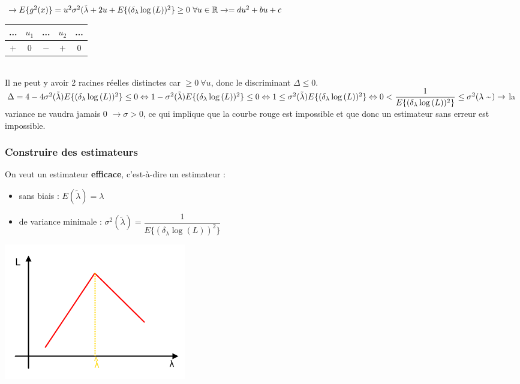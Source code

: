\documentclass{article}
\newcommand{\R}{\mathbb{R}}
\newcommand{\lti}{\tilde{\lambda}}
\begin{document}
$\rightarrow E\{g^2(x)\} = u^2\sigma^2(\lti + 2u + E \{ (\delta_\lambda\log{(L)})^2 \} \geq 0\ \forall u \in \R \\
\rightarrow = du^2+bu+c \\$

\begin{tabular}{|*{5}{c|}}
\hline
... & $u_1$ & ... & $u_2$ & ... \\
\hline
$+$ & $0$ & $-$ & $+$ & $0$ \\
\hline
\end{tabular} \\

Il ne peut y avoir 2 racines réelles distinctes car $\geq 0\ \forall u$, donc le discriminant $\Delta \leq 0$. \\
$\Delta = 4 - 4 \sigma^2(\lti) E\{ (\delta_\lambda\log{(L)})^2 \} \leq 0 \\ 
\Leftrightarrow 1 - \sigma^2(\lti) E\{ (\delta_\lambda\log{(L)})^2 \} \leq 0 \\ 
\Leftrightarrow 1 \leq \sigma^2(\lti) E\{ (\delta_\lambda\log{(L)})^2 \} \\ 
\Leftrightarrow 0 < \dfrac{1}{E\{ (\delta_\lambda\log{(L)})^2 \}} \leq \sigma^2(\lambda$\~{}$) \\ 
\rightarrow$ la variance ne vaudra jamais 0 $\rightarrow \sigma > 0$, ce qui implique que la courbe rouge est impossible et que
donc un estimateur sans erreur est impossible.

\subsubsection*{Construire des estimateurs}

On veut un estimateur \textbf{efficace}, c'est-à-dire un estimateur :
\begin{itemize}
\item sans biais : $ E(\lti) = \lambda$
\item de variance minimale : $\sigma^2(\lti) = \dfrac{1}{E\{(\delta_\lambda\log{(L)})^2 \}}$
\end{itemize}

\includegraphics{Figure2-5.png}
\end{document}
